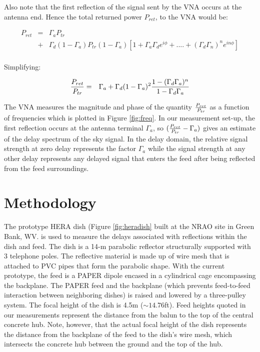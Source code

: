\documentclass[12pt,preprint]{aastex}
\begin{document}
Also note that the first reflection of the signal sent by the VNA occurs at the antenna end. Hence the total returned power $P_{ret}$, to the VNA  would be:

\begin{eqnarray}
P_{ret} & = & \Gamma_{a}P_{tr} \nonumber\\ 
 & + &   \Gamma_{d}(1-\Gamma_a) P_{tr}(1-\Gamma_{a}) [1+ \Gamma_{a}\Gamma_{d} e^{i\phi}+  ....+ (\Gamma_{d}\Gamma_{n})^{n}e^{in\phi}]\nonumber\\
 \end{eqnarray}
 
Simplifying:
 
  \begin{eqnarray}
 {P_{ret} \over P_{tr} } & = & \Gamma_{a}
  +  \Gamma_{d}(1-\Gamma_a)^{2}  {1-(\Gamma_{d}\Gamma_{a})^{n} \over 1-\Gamma_{d} \Gamma_{a} } \nonumber\\
\end{eqnarray}

The VNA measures the magnitude and phase of the quantity ${P_{ret}\over P_{tr}}$ as a function of frequencies which is plotted in Figure \ref{fig:freq}. In our measurement set-up, the first reflection occurs at the antenna terminal $\Gamma_{a}$, so $({P_{ret} \over P_{tr} }  - \Gamma_{a}) $ gives an estimate of the delay spectrum of the sky signal. In the delay domain, the relative signal strength at zero delay represents the factor $\Gamma_{a}$ while the signal strength at any other delay represents any delayed signal that enters the feed after being reflected from the feed surroundings. 

\section{Methodology}{\label{sec:methods}}

The prototype HERA dish (Figure \ref{fig:heradish} built at the NRAO site in
Green Bank, WV. is used to measure the delays associated with reflections within the dish and feed.
The dish is a 14-m parabolic reflector structurally supported
with 3 telephone poles. The reflective material is made up of wire mesh that
is attached to PVC pipes that form the parabolic shape. With the current
prototype, the feed is a PAPER dipole encased in a cylindrical cage encompassing
the backplane. The PAPER feed and the backplane (which prevents feed-to-feed
interaction between neighboring dishes) is raised and lowered by a three-pulley
system. The focal height of the dish is 4.5m ($\sim{14.76}$ft). Feed heights quoted in our measurements represent the distance from the balun to the top of the central concrete hub. Note, however, that the actual focal height of the dish represents the distance from the backplane of the feed to the dish's wire mesh, which intersects the concrete hub between the ground and the top of the hub. 
\end{document}
